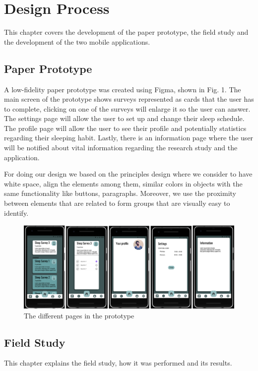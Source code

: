 \documentclass{article}
\begin{document}
\section{Design Process}
This chapter covers the development of the paper prototype, the field study and the development of the two mobile applications.

\subsection{Paper Prototype}
A low-fidelity paper prototype was created using Figma, shown in Fig. 1. The main screen of the prototype shows surveys represented as cards that the user has to complete, clicking on one of the surveys will enlarge it so the user can answer.  The settings page will allow the user to set up and change their sleep schedule. The profile page will allow the user to see their profile and potentially statistics regarding their sleeping habit.  Lastly, there is an information page where the user will be notified about vital information regarding the research study and the application.
 
For doing our design we based on the principles design where we consider to have white space, align the elements among them, similar colors in objects with the same functionality like buttons, paragraphs.\cite{galitz_essential_2007} Moreover,  we use the proximity between elements that are related to form groups that are visually easy to identify.

\begin{figure}[!h]
  \begin{center}
    \includegraphics[scale=0.8]{FigmaPrototype.png}
    \caption{The different pages in the prototype}
    \label{fig:figmaPrototype}
  \end{center}
\end{figure}

\subsection{Field Study}
This chapter explains the field study, how it was performed and its results. 
\end{document}
